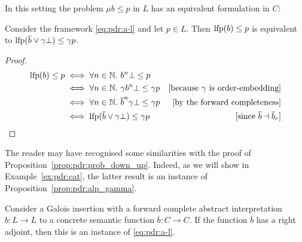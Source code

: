 In this setting the problem $\mu b \le p$ in $L$ has an equivalent formulation in  $C$:
\begin{prop}\label{prop:pdr:alp_gamma}
	Consider the framework \eqref{eq:pdr:a-l} and let $p \in L$.
	Then $\text{lfp}(b) \le p$ is equivalent to $\text{lfp}(\overline{b} \lor \gamma \bot) \le \gamma p$.
\end{prop}
\begin{proof}
	\begin{align*}
		\text{lfp}(b) \le p
		 & \iff \forall n \in \mathbb{N}.~b^n \bot \le p                                                                              \\
		 & \iff \forall n \in \mathbb{N}.~\gamma b^n \bot \le \gamma p            & [\text{because $\gamma$ is order-embedding}]      \\
		 & \iff \forall n \in \mathbb{N}.~\overline{b}^n \gamma \bot \le \gamma p & [\text{by the forward completeness}]              \\
		 & \iff \text{lfp}(\overline{b} \lor  \gamma \bot) \le \gamma p                 & [\text{since }\overline{b} \dashv \overline{b}_r]
	\end{align*}
\end{proof}
The reader may have recognised some similarities with the proof of Proposition~\ref{prop:pdr:prob_down_up}. Indeed, as we will show in Example~\ref{ex:pdr:cat}, the latter result is an instance of Proposition~\ref{prop:pdr:alp_gamma}.

\begin{example}
	Consider a Galois insertion with a forward complete abstract interpretation $b\colon L \to L$ to a concrete semantic function $\overline{b}\colon C \to C$. If the function $\overline{b}$ has a right adjoint, then this is an instance of \eqref{eq:pdr:a-l}.
\end{example}


